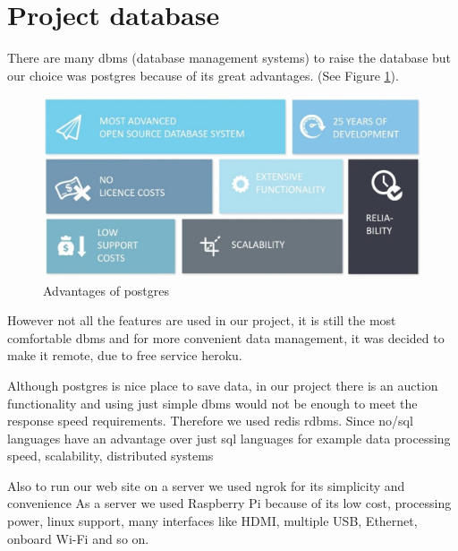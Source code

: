 \section{Project database}
There are many dbms (database management systems) to raise the database but our choice was
postgres because of its great advantages. (See Figure \ref{fig:database}).
\begin{figure}[ht!]
    \centering
    \includegraphics[scale=0.5]{figures/database.jpg}
    \caption{Advantages of postgres}
    \label{fig:database}
\end{figure}

However not all the features are used in our project, it is still the most comfortable dbms
and for more convenient data management, it was decided to make it remote, due to free
service heroku.

Although postgres is nice place to save data, in our project there is an auction
functionality and using just simple dbms would not be enough to meet the response speed
requirements. Therefore we used redis rdbms. Since no/sql languages   have an advantage over
just sql languages   for example data processing speed, scalability, distributed systems

Also to run our web site on a server we used ngrok for its simplicity and convenience
As a server we used Raspberry Pi because of its low cost, processing power, linux support, many
interfaces like HDMI, multiple USB, Ethernet, onboard Wi-Fi and so on.
\clearpage
